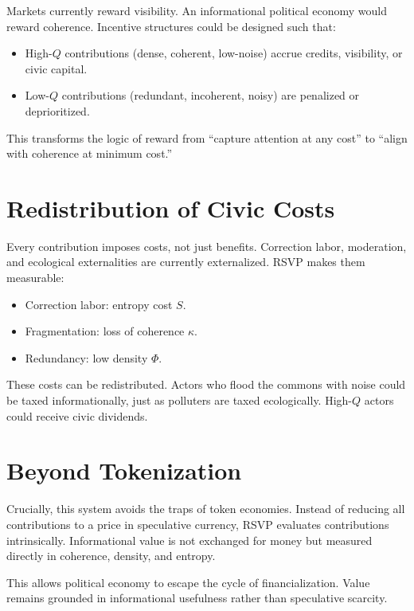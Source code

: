 \documentclass[openany]{book}
\begin{document}
Markets currently reward visibility. An informational political economy would reward coherence. Incentive structures could be designed such that:

\begin{itemize}
    \item High-$Q$ contributions (dense, coherent, low-noise) accrue credits, visibility, or civic capital.
    \item Low-$Q$ contributions (redundant, incoherent, noisy) are penalized or deprioritized.
\end{itemize}

This transforms the logic of reward from ``capture attention at any cost'' to ``align with coherence at minimum cost.''

\section{Redistribution of Civic Costs}

Every contribution imposes costs, not just benefits. Correction labor, moderation, and ecological externalities are currently externalized. RSVP makes them measurable:

\begin{itemize}
    \item Correction labor: entropy cost $S$.
    \item Fragmentation: loss of coherence $\kappa$.
    \item Redundancy: low density $\Phi$.
\end{itemize}

These costs can be redistributed. Actors who flood the commons with noise could be taxed informationally, just as polluters are taxed ecologically. High-$Q$ actors could receive civic dividends.

\section{Beyond Tokenization}

Crucially, this system avoids the traps of token economies. Instead of reducing all contributions to a price in speculative currency, RSVP evaluates contributions intrinsically. Informational value is not exchanged for money but measured directly in coherence, density, and entropy.

This allows political economy to escape the cycle of financialization. Value remains grounded in informational usefulness rather than speculative scarcity.
\end{document}
